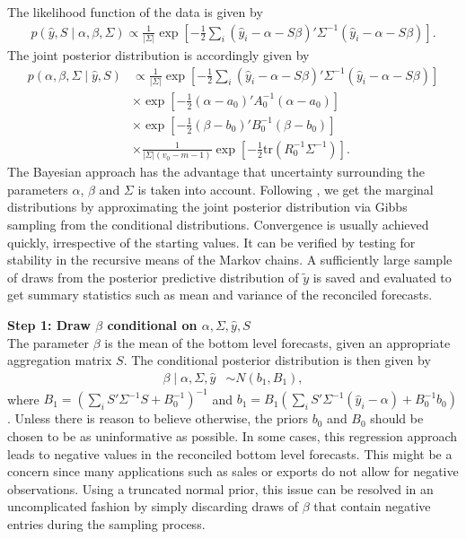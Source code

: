 \documentclass[a4paper,fleqn,11pt]{article}
\begin{document}
The likelihood function of the data is given by
\begin{align*}
p(\hat{y},S \mid \alpha,\beta,\Sigma) \propto \frac{1}{|\Sigma|} \exp\left[-\frac{1}{2} \sum_i (\hat{y}_i - \alpha - S\beta)'\Sigma^{-1}(\hat{y}_i - \alpha - S\beta)\right].
\end{align*}
The joint posterior distribution is accordingly given by
\begin{align*}
p(\alpha,\beta,\Sigma \mid \hat{y},S) & \propto \frac{1}{|\Sigma|} \exp\left[-\frac{1}{2} \sum_i (\hat{y}_i - \alpha - S\beta)'\Sigma^{-1}(\hat{y}_i - \alpha - S\beta)\right] \\
&\times \exp \left[-\frac{1}{2}(\alpha - a_0)'A_0^{-1}(\alpha - a_0)\right] \\
&\times \exp \left[-\frac{1}{2}(\beta - b_0)'B_0^{-1}(\beta - b_0)\right] \\
&\times \frac{1}{|\Sigma|(v_0 - m - 1)} \exp \left[-\frac{1}{2} \text{tr}(R_0^{-1}\Sigma^{-1}) \right].
\end{align*}
The Bayesian approach has the advantage that uncertainty surrounding the parameters $\alpha$, $\beta$ and $\Sigma$ is taken into account. Following \cite{Percy1992}, we get the marginal distributions by approximating the joint posterior distribution via Gibbs sampling from the conditional distributions. Convergence is usually achieved quickly, irrespective of the starting values. It can be verified by testing for stability in the recursive means of the Markov chains. A sufficiently large sample of draws from the posterior predictive distribution of $\tilde{y}$ is saved and evaluated to get summary statistics such as mean and variance of the reconciled forecasts.

\noindent\textbf{Step 1: Draw $\beta$ conditional on $\alpha,\Sigma,\hat{y},S$}\\
The parameter $\beta$ is the mean of the bottom level forecasts, given an appropriate aggregation matrix $S$. The conditional posterior distribution is then given by
\begin{align}
\beta \mid \alpha,\Sigma,\hat{y} &\sim N(b_1,B_1),
\end{align}
where $B_1 = \left(\sum_i S'\Sigma^{-1}S + B_0^{-1}\right)^{-1}$ and $b_1 = B_1 \left(\sum_i S'\Sigma^{-1} (\hat{y}_i - \alpha) + B_0^{-1}b_0\right)$. Unless there is reason to believe otherwise, the priors $b_0$ and $B_0$ should be chosen to be as uninformative as possible. In some cases, this regression approach leads to negative values in the reconciled bottom level forecasts. This might be a concern since many applications such as sales or exports do not allow for negative observations. Using a truncated normal prior, this issue can be resolved in an uncomplicated fashion by simply discarding draws of $\beta$ that contain negative entries during the sampling process.
\end{document}
